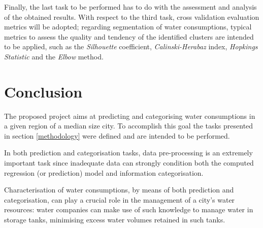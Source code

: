 \documentclass[11pt]{article}
\begin{document}
Finally, the last task to be performed has to do with the assessment and analysis of the obtained results. With respect to the third task, cross validation evaluation metrics will be adopted; regarding segmentation of water consumptions, typical metrics to assess the quality and tendency of the identified clusters are intended to be applied, such as the \emph{Silhouette} coefficient, \emph{Calinski-Herabaz} index, \emph{Hopkings Statistic} and the \emph{Elbow} method.

\section{Conclusion}

The proposed project aims at predicting and categorising water consumptions in a given region of a median size city. To accomplish this goal the tasks presented in section \ref{methodology} were defined and are intended to be performed.

In both prediction and categorisation tasks, data pre-processing is an extremely important task since inadequate data can strongly condition both the computed regression (or prediction) model and information categorisation.

Characterisation of water consumptions, by means of both prediction and categorisation, can play a crucial role in the management of a city's water resources: water companies can make use of such knowledge to manage water in storage tanks, minimising excess water volumes retained in such tanks.


\renewcommand\bibname{References}

\end{document}

